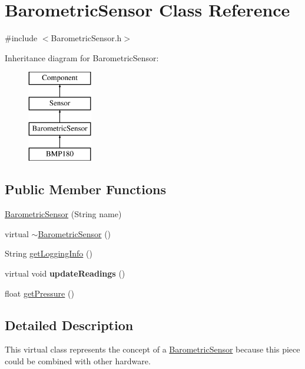 \hypertarget{classBarometricSensor}{}\section{Barometric\+Sensor Class Reference}
\label{classBarometricSensor}


{\ttfamily \#include $<$Barometric\+Sensor.\+h$>$}

Inheritance diagram for Barometric\+Sensor\+:\begin{figure}[H]
\begin{center}
\leavevmode
\includegraphics[height=4.000000cm]{classBarometricSensor}
\end{center}
\end{figure}
\subsection*{Public Member Functions}
\begin{DoxyCompactItemize}
\item 
\hyperlink{classBarometricSensor_adc95a4d0a8696c65e7556788d4131c83}{Barometric\+Sensor} (String name)
\item 
virtual \hyperlink{classBarometricSensor_a17f40d7055700aa4feedc0755485d5d4}{$\sim$\+Barometric\+Sensor} ()
\item 
String \hyperlink{classBarometricSensor_aec99521f41d1a912447b6a9145530b81}{get\+Logging\+Info} ()
\item 
\hypertarget{classBarometricSensor_a9f7875e4509fb9c57df9eddc76de993e}{}virtual void {\bfseries update\+Readings} ()\label{classBarometricSensor_a9f7875e4509fb9c57df9eddc76de993e}

\item 
float \hyperlink{classBarometricSensor_a7a4c8a68ebf409ea53baf36c9344307f}{get\+Pressure} ()
\end{DoxyCompactItemize}


\subsection{Detailed Description}
This virtual class represents the concept of a \hyperlink{classBarometricSensor}{Barometric\+Sensor} because this piece could be combined with other hardware. 

